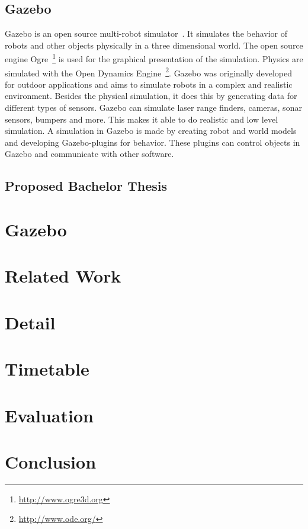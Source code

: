 \documentclass[11pt,a4paper,titlepage]{article}
\begin{document}
\subsection{Gazebo}
Gazebo is an open source multi-robot simulator~\cite{GazeboDesign}. It simulates the behavior of robots and other objects physically in a three dimensional world. The open source engine Ogre~\footnote{\url{http://www.ogre3d.org}} is used for the graphical presentation of the simulation. Physics are simulated with the Open Dynamics Engine~\footnote{\url{http://www.ode.org/}}. Gazebo was originally developed for outdoor applications and aims to simulate robots in a complex and realistic environment. Besides the physical simulation, it does this by generating data for different types of sensors. Gazebo can simulate laser range finders, cameras, sonar sensors, bumpers and more. This makes it able to do realistic and low level simulation. A simulation in Gazebo is made by creating robot and world models and developing Gazebo-plugins for behavior. These plugins can control objects in Gazebo and communicate with other software.
\subsection{Proposed Bachelor Thesis}



\section{Gazebo}
\section{Related Work}
\section{Detail}
\section{Timetable}
\section{Evaluation}
\section{Conclusion}



\end{document}
